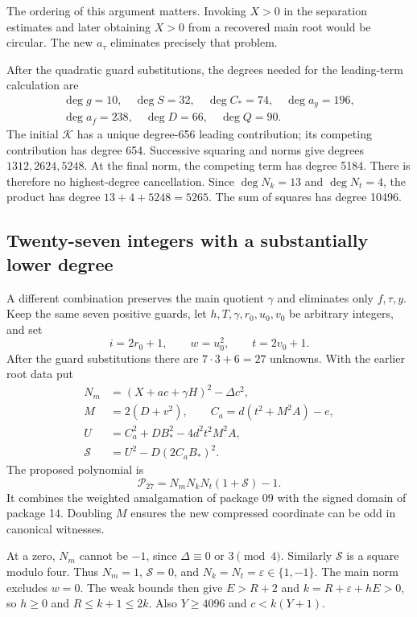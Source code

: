The ordering of this argument matters.  Invoking $X>0$ in the
separation estimates and later obtaining $X>0$ from a recovered main
root would be circular.  The new $a_\tau$ eliminates precisely that
problem.

After the quadratic guard substitutions, the degrees needed for the
leading-term calculation are
\begin{gather*}
\deg g=10,\quad \deg S=32,\quad \deg C_*=74,\quad\deg a_y=196,\\
\deg a_f=238,\quad\deg D=66,\quad\deg Q=90.
\end{gather*}
The initial $\mathcal K$ has a unique degree-656 leading contribution;
its competing contribution has degree 654.  Successive squaring and
norms give degrees $1312,2624,5248$.  At the final norm, the competing
term has degree 5184.  There is therefore no highest-degree
cancellation.  Since $\deg N_k=13$ and $\deg N_t=4$, the product has
degree $13+4+5248=5265$.  The sum of squares has degree 10496.

\subsection{Twenty-seven integers with a substantially lower degree}

A different combination preserves the main quotient $\gamma$ and
eliminates only $f,\tau,y$.  Keep the same seven positive guards, let
$h,T,\gamma,r_0,u_0,v_0$ be arbitrary integers, and set
\[
i=2r_0+1,\qquad w=u_0^2,\qquad t=2v_0+1.
\]
After the guard substitutions there are $7\cdot3+6=27$ unknowns.
With the earlier root data put
\begin{align}
N_m&=(X+ac+\gamma H)^2-\Delta c^2,\nonumber\\
M&=2(D+v^2),\qquad C_a=d(t^2+M^2A)-e,\nonumber\\
U&=C_a^2+DB_*^2-4d^2t^2M^2A,\label{eq:integer27recipe}\\
\mathcal S&=U^2-D(2C_aB_*)^2.\nonumber
\end{align}
The proposed polynomial is
\begin{equation}
\boxed{\mathcal P_{27}=N_mN_kN_t(1+\mathcal S)-1.}
\label{eq:P27}
\end{equation}
It combines the weighted amalgamation of package 09 with the signed
domain of package 14.  Doubling $M$ ensures the new compressed
coordinate can be odd in canonical witnesses.

At a zero, $N_m$ cannot be $-1$, since
$\Delta\equiv0$ or $3\pmod4$.  Similarly $\mathcal S$ is a square
modulo four.  Thus $N_m=1$, $\mathcal S=0$, and
$N_k=N_t=\varepsilon\in\{1,-1\}$.  The main norm excludes $w=0$.
The weak bounds then give $E>R+2$ and
$k=R+\varepsilon+hE>0$, so $h\ge0$ and $R\le k+1\le2k$.
Also $Y\ge4096$ and $c<k(Y+1)$.

